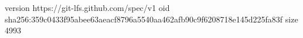 version https://git-lfs.github.com/spec/v1
oid sha256:359c0433f95abee63aeacf8796a5540aa462afb90c9f6208718e145d225fa83f
size 4993
